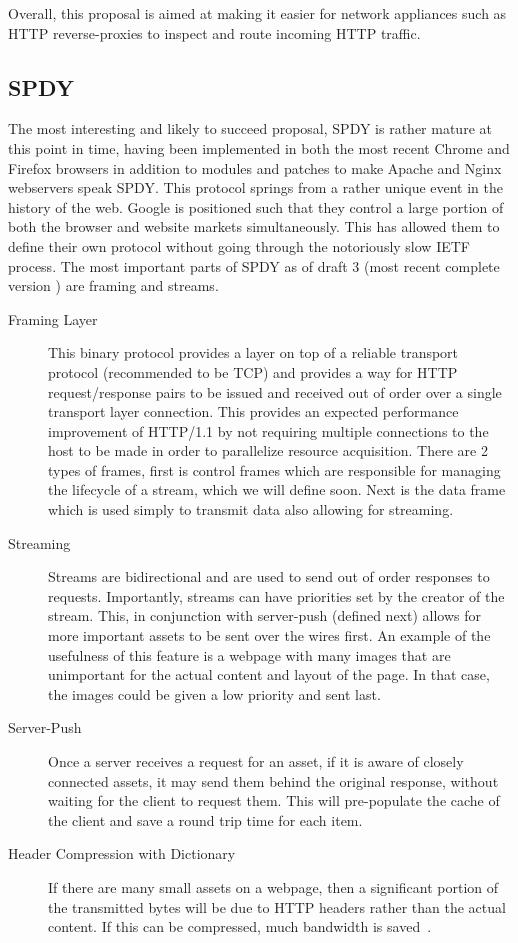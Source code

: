 \documentclass[11pt,letterpaper,notitlepage]{article}
\begin{document}
Overall, this proposal is aimed at making it easier for network appliances such
as HTTP reverse-proxies to inspect and route incoming HTTP traffic.

\subsection{SPDY}
\label{sec:intro/spdy}
The most interesting and likely to succeed proposal, SPDY is rather mature
at this point in time, having been implemented in both the most recent Chrome
and Firefox browsers in addition to modules and patches to make Apache and Nginx
webservers speak SPDY.  This protocol springs from a rather unique event in the
history of the web. Google is positioned such that they control a large portion
of both the browser and website markets simultaneously. This has allowed them to
define their own protocol without going through the notoriously slow IETF
process.  The most important parts of SPDY as of draft 3 (most recent complete version
 \cite{spdy3}) are framing and streams. 
\begin{description}
\item[Framing Layer] This binary protocol provides a layer on top of a reliable transport
protocol (recommended to be TCP) and provides a way for HTTP request/response
pairs to be issued and received out of order over a single transport layer
connection.  This provides an expected performance improvement of HTTP/1.1 by
not requiring multiple connections to the host to be made in order to
parallelize resource acquisition. There are 2 types of frames, first is control
frames which are responsible for managing the lifecycle of a stream, which we
will define soon.  Next is the data frame which is used simply to transmit data
also allowing for streaming. 
\item[Streaming] Streams are bidirectional and are used to send out of order
responses to requests. Importantly, streams can have priorities set by the
creator of the stream.  This, in conjunction with server-push (defined next)
allows for more important assets to be sent over the wires first.  An example of
the usefulness of this feature is a webpage with many images that are
unimportant for the actual content and layout of the page.  In that case, the
images could be given a low priority and sent last.
\item[Server-Push] Once a server receives a request for an asset, if it is aware
of closely connected assets, it may send them behind the original response,
without waiting for the client to request them.  This will pre-populate the
cache of the client and save a round trip time for each item.
\item[Header Compression with Dictionary] If there are many small assets on a
webpage, then a significant portion of the transmitted bytes will be due to HTTP
headers rather than the actual content.  If this can be compressed, much
bandwidth is saved~\cite{binoy}.
\end{description}
\end{document}
